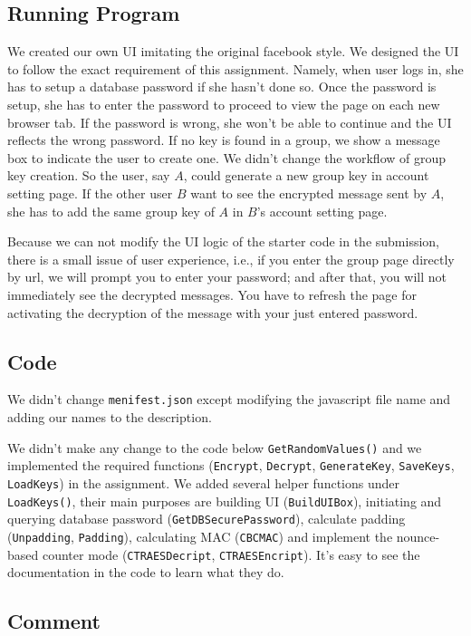 \subsection{Running Program}

We created our own UI imitating the original facebook style. We designed the UI to follow the exact requirement of this assignment. Namely, when user logs in, she has to setup a database password if she hasn't done so. Once the password is setup, she has to enter the password to proceed to view the page on each new browser tab. If the password is wrong, she won't be able to continue and the UI reflects the wrong password. If no key is found in a group, we show a message box to indicate the user to create one. 
We didn't change the workflow of group key creation. So the user, say $A$, could generate a new group key in account setting page. If the other user $B$ want to see the encrypted message sent by $A$, she has to add the same group key of $A$ in $B$'s account setting page. 

Because we can not modify the UI logic of the starter code in the submission, there is a small issue of user experience, i.e., if you enter the group page directly by url, we will prompt you to enter your password; and after that, you will not immediately see the decrypted messages. You have to refresh the page for activating the decryption of the message with your just entered password. 

\subsection{Code}

We didn't change \texttt{menifest.json} except modifying the javascript file name and adding our names to the description.

We didn't make any change to the code below \texttt{GetRandomValues()} and we implemented the required functions (\texttt{Encrypt}, \texttt{Decrypt}, \texttt{GenerateKey}, \texttt{SaveKeys}, \texttt{LoadKeys}) in the assignment. We added several helper functions under \texttt{LoadKeys()}, their main purposes are building UI (\texttt{BuildUIBox}), initiating and querying database password (\texttt{GetDBSecurePassword}), calculate padding (\texttt{Unpadding}, \texttt{Padding}), calculating MAC (\texttt{CBCMAC}) and implement the nounce-based counter mode (\texttt{CTRAESDecript}, \texttt{CTRAESEncript}). It's easy to see the documentation in the code to learn what they do.

\subsection{Comment}

